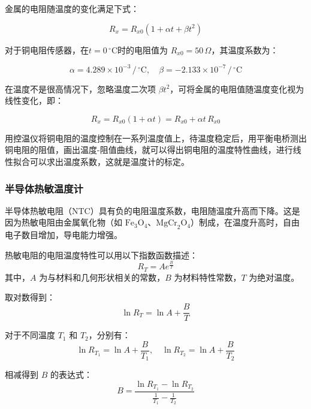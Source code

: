 \documentclass[zihao=5, UTF8]{article}
\theoremstyle{MyLineTheoremStyle} %
\theoremstyle{MyBlockTheoremStyle} %
\theoremstyle{MySubsubsectionStyle} %
\begin{document}
金属的电阻随温度的变化满足下式：

\begin{equation}
R_x = R_{x0} (1 + \alpha t + \beta t^2)
\label{eq:resistance_temp}
\end{equation}

对于铜电阻传感器，在$ t = 0 \, ^\circ \text{C} $时的电阻值为 $ R_{x0} = 50 \, \Omega $，其温度系数为：

\begin{equation}
\alpha = 4.289 \times 10^{-3} \, / \, ^\circ \text{C}, \quad \beta = -2.133 \times 10^{-7} \, / \, ^\circ \text{C}
\label{eq:coefficients}
\end{equation}

在温度不是很高情况下，忽略温度二次项 $\beta t^2$，可将金属的电阻值随温度变化视为线性变化，即：

\begin{equation}
R_x = R_{x0} (1 + \alpha t) = R_{x0} + \alpha t \, R_{x0}
\label{eq:linear_approximation}
\end{equation}

用控温仪将铜电阻的温度控制在一系列温度值上，待温度稳定后，用平衡电桥测出铜电阻的阻值，画出温度-阻值曲线，就可以得出铜电阻的温度特性曲线，进行线性拟合可以求出温度系数，这就是温度计的标定。

\subsubsection{半导体热敏温度计}

半导体热敏电阻（NTC）具有负的电阻温度系数，电阻随温度升高而下降。这是因为热敏电阻由金属氧化物（如 $\mathrm{Fe}_3\mathrm{O}_4$、$\mathrm{MgCr}_2\mathrm{O}_4$）制成，在温度升高时，自由电子数目增加，导电能力增强。

热敏电阻的电阻温度特性可以用以下指数函数描述：
\begin{equation}
R_T = A e^{\frac{B}{T}}
\end{equation}
其中，$A$ 为与材料和几何形状相关的常数，$B$ 为材料特性常数，$T$ 为绝对温度。

取对数得到：
\begin{equation}
\ln R_T = \ln A + \frac{B}{T}
\end{equation}

对于不同温度 $T_1$ 和 $T_2$，分别有：
\begin{equation}
\ln R_{T_1} = \ln A + \frac{B}{T_1}, \quad \ln R_{T_2} = \ln A + \frac{B}{T_2}
\end{equation}

相减得到 $B$ 的表达式：
\begin{equation}
B = \frac{\ln R_{T_1} - \ln R_{T_2}}{\frac{1}{T_1} - \frac{1}{T_2}}
\end{equation}
\end{document}
